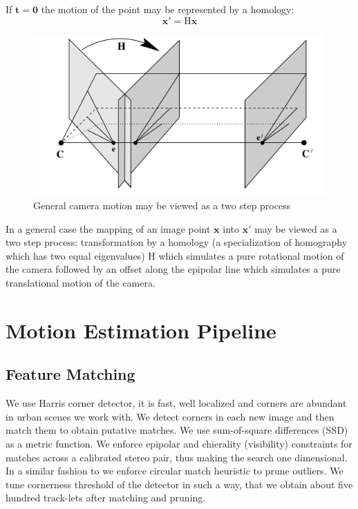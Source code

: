 \documentclass[runningheads]{llncs}
\begin{document}
If $\mathbf{t} = \mathbf{0}$ the motion of the point may be represented by a homology:
\[
\mathbf{x}' = \mathrm{H}\mathbf{x}
\]

\begin{figure}[h]
\includegraphics[scale=.3]{general_camera_motion}
\centering
\caption{General camera motion may be viewed as a two step process}
\end{figure}

In a general case the mapping of an image point $\mathbf{x}$ into $\mathbf{x}'$ may be viewed as a two step process: transformation by a homology (a specialization of homography which has two equal eigenvalues) $\mathrm{H}$ which simulates a pure rotational motion of the camera followed by an offset along the epipolar line which simulates a pure translational motion of the camera.

\section{Motion Estimation Pipeline}

\subsection{Feature Matching}
We use Harris corner detector, it is fast, well localized and corners
are abundant in urban scenes we work with. We detect corners in each
new image and then match them to obtain putative matches. We use
sum-of-square differences (SSD) as a metric function.  We enforce
epipolar and chierality (visibility) constraints for matches across a
calibrated stereo pair, thus making the search one dimensional. In a
similar fashion to \cite{Geiger2011} we enforce circular match
heuristic to prune outliers.  We tune cornerness threshold of the
detector in such a way, that we obtain about five hundred track-lets
after matching and pruning.
\end{document}
